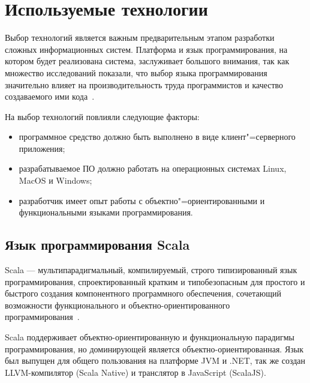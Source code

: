 \section{Используемые технологии}
\label{sec:techs:intro}

Выбор технологий является важным предварительным этапом разработки сложных информационных систем. Платформа и язык программирования, на котором будет реализована система, заслуживает большого внимания, так как множество исследований показали, что выбор языка программирования значительно влияет на производительность труда программистов и качество создаваемого ими кода~\cite[c.~59]{mcconnell_2005}.

На выбор технологий повлияли следующие факторы:
\begin{itemize}
\item программное средство должно быть выполнено в виде клиент"=серверного приложения;
\item разрабатываемое ПО должно работать на операционных системах Linux, MacOS и Windows;
\item разработчик имеет опыт работы с объектно"=ориентированными и функциональными языками программирования.
\end{itemize}

\subsection{Язык программирования Scala}
\label{sub:techs:scala}
Scala — мультипарадигмальный, компилируемый, строго типизированный язык программирования, спроектированный кратким и типобезопасным для простого и быстрого создания компонентного программного обеспечения, сочетающий возможности функционального и объектно-ориентированного программирования~\cite{wiki_scala}.

Scala поддерживает объектно-ориентированную и функциональную парадигмы программирования, но доминирующей является объектно-ориентированная. Язык был выпущен для общего пользования на платформе JVM и .NET, так же создан LLVM-компилятор (Scala Native) и транслятор в JavaScript (ScalaJS).

